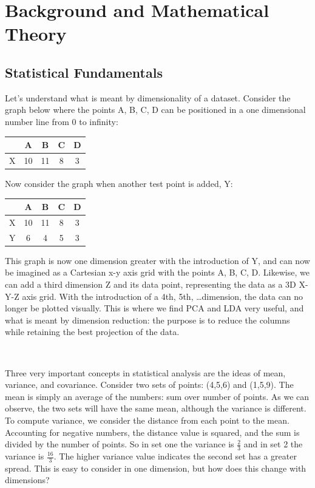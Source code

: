 \documentclass{article}
\begin{document}
\section{Background and Mathematical Theory}
\subsection{Statistical Fundamentals}
Let's understand what is meant by dimensionality of a dataset. Consider the graph below where the points A, B, C, D can be positioned in a one dimensional number line from 0 to infinity:

\begin{center}
\begin{tabular}{c|c|c|c|c}
 & A & B & C & D \\
\hline
X & 10 & 11 & 8 & 3 \\
\end{tabular}
\end{center}

Now consider the graph when another test point is added, Y:

\begin{center}
\begin{tabular}{c|c|c|c|c}
 & A & B & C & D \\
\hline
X & 10 & 11 & 8 & 3 \\
Y & 6 & 4 & 5 & 3 \\
\end{tabular}
\end{center}

This graph is now one dimension greater with the introduction of Y, and can now be imagined as a Cartesian x-y axis grid with the points A, B, C, D. Likewise, we can add a third dimension Z and its data point, representing the data as a 3D X-Y-Z axis grid. With the introduction of a 4th, 5th, \dots dimension, the data can no longer be plotted visually. This is where we find PCA and LDA very useful, and what is meant by dimension reduction: the purpose is to reduce the columns while retaining the best projection of the data.

\

Three very important concepts in statistical analysis are the ideas of mean, variance, and covariance. Consider two sets of points: (4,5,6) and (1,5,9). The mean is simply an average of the numbers: sum over number of points. As we can observe, the two sets will have the same mean, although the variance is different. To compute variance, we consider the distance from each point to the mean. Accounting for negative numbers, the distance value is squared, and the sum is divided by the number of points. So in set one the variance is $\frac{2}{3}$ and in set 2 the variance is $\frac{16}{3}$. The higher variance value indicates the second set has a greater spread. This is easy to consider in one dimension, but how does this change with dimensions?
\end{document}
